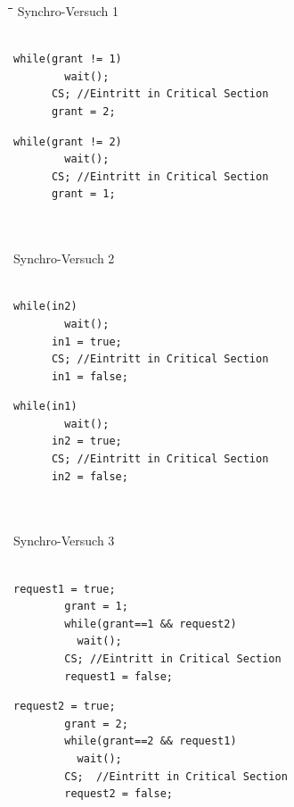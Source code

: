 \begin{tabbing}
  \hspace*{1cm}\=\hspace*{4.2cm}\=\hspace*{3cm}\=\hspace*{2.7cm}\= \kill
  Synchro-Versuch 1\\
   \> \> \\
  \>\begin{lstlisting}[style=C]
      while(grant != 1)
        wait(); 
      CS; //Eintritt in Critical Section 
      grant = 2; 
    \end{lstlisting} \> \> \>
    \begin{lstlisting}[style=C]
      while(grant != 2)
        wait(); 
      CS; //Eintritt in Critical Section  
      grant = 1; 
    \end{lstlisting} \\\\
    
  Synchro-Versuch 2\\
    \> \> \\
   \>\begin{lstlisting}[style=C]
      while(in2)
        wait(); 
      in1 = true; 
      CS; //Eintritt in Critical Section 
      in1 = false; 
    \end{lstlisting} \> \> \>
    \begin{lstlisting}[style=C]
      while(in1)
        wait(); 
      in2 = true; 
      CS; //Eintritt in Critical Section 
      in2 = false; 
    \end{lstlisting} \\\\

  Synchro-Versuch 3\\
    \> \> \\
   \>\begin{lstlisting}[style=C]
        request1 = true; 
        grant = 1; 
        while(grant==1 && request2)
          wait(); 
        CS; //Eintritt in Critical Section  
        request1 = false; 
    \end{lstlisting} \> \> \>
    \begin{lstlisting}[style=C]
        request2 = true; 
        grant = 2; 
        while(grant==2 && request1)
          wait(); 
        CS;  //Eintritt in Critical Section 
        request2 = false;  
    \end{lstlisting} \\ 
\end{tabbing}

